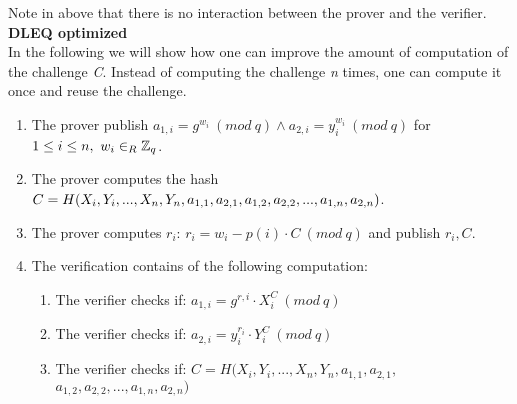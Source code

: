 \noindent
Note in above that there is no interaction between the prover and the verifier. \\

\noindent 
\textbf{DLEQ optimized}\\
In the following we will show how one can improve the amount of computation of the challenge \textit{C}. Instead of computing the challenge \textit{n} times, one can compute it once and reuse the challenge.

\begin{enumerate}
    \item The prover publish  \begin{math}a_{1,i}=g^{w_i} \ (mod\ q)  \land a_{2,i}=y_i^{w_i} \ (mod\ q)\end{math}  for  \begin{math} 1\leq i \leq n, \ w_i\in_R \mathbb{Z}_q \end{math}.
    \item The prover computes the hash \begin{math}C=H(X_i,Y_i,...,X_n,Y_n,a_{1,1},a_{2,1},\\a_{1,2},a_{2,2},...,a_{1,n},a_{2,n})\end{math}.
    \item The prover computes \begin{math}r_i\end{math}:  \begin{math}r_i=w_i-p(i)  \cdot  C \ (mod\ q)\end{math} and publish \begin{math}r_i,C\end{math}.
    \item The verification contains of the following computation:
    \begin{enumerate}        
        \item The verifier checks if:   \begin{math}a_{1,i} = g^{r,i} \cdot X_i^C \ (mod\ q) \end{math}
        \item The verifier checks if:  \begin{math} a_{2,i}=y_i^{r_{i}}  \cdot  Y_i^C \ (mod\ q)\end{math}
         \item The verifier checks if:  $C=H(X_i,Y_i,...,X_n,Y_n,a_{1,1},a_{2,1},$\\
$a_{1,2},a_{2,2},...,a_{1,n},a_{2,n})$
    \end{enumerate}
\end{enumerate}

